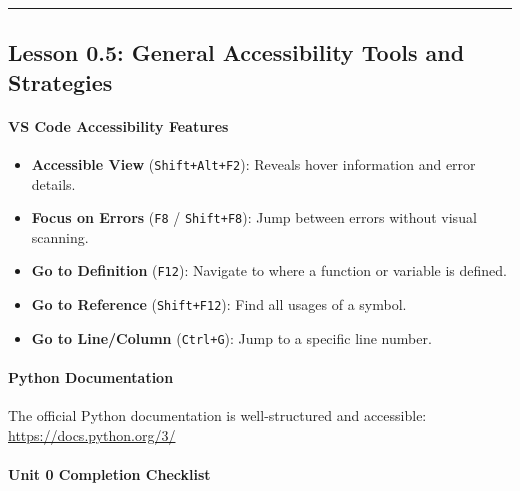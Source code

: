\documentclass[
  justified,
  openright,
]{tufte-book}
\let\subsubsection\paragraph
\let\paragraph\paragraph
\let\subsubsection\paragraph
\let\paragraph\paragraph
\providecommand{\tightlist}{%
  \setlength{\itemsep}{0pt}\setlength{\parskip}{0pt}}
\begin{document}
\begin{center}\rule{0.5\linewidth}{0.5pt}\end{center}

\subsection{Lesson 0.5: General Accessibility Tools and
Strategies}\label{lesson-0.5-general-accessibility-tools-and-strategies}

\subsubsection{VS Code Accessibility
Features}\label{vs-code-accessibility-features}

\begin{itemize}
\tightlist
\item
  \textbf{Accessible View} (\texttt{Shift+Alt+F2}): Reveals hover
  information and error details.
\item
  \textbf{Focus on Errors} (\texttt{F8} / \texttt{Shift+F8}): Jump
  between errors without visual scanning.
\item
  \textbf{Go to Definition} (\texttt{F12}): Navigate to where a function
  or variable is defined.
\item
  \textbf{Go to Reference} (\texttt{Shift+F12}): Find all usages of a
  symbol.
\item
  \textbf{Go to Line/Column} (\texttt{Ctrl+G}): Jump to a specific line
  number.
\end{itemize}

\subsubsection{Python Documentation}\label{python-documentation}

The official Python documentation is well-structured and accessible:
\url{https://docs.python.org/3/}

\subsubsection{Unit 0 Completion
Checklist}\label{unit-0-completion-checklist}
\end{document}
